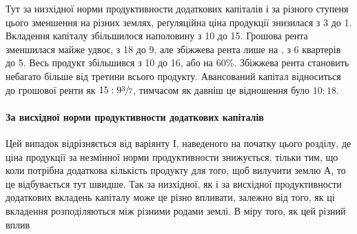 \noindent{}Тут за низхідної норми продуктивности додаткових капіталів і за різного
ступеня цього зменшення на різних землях, реґуляційна ціна продукції знизилася
з 3 до 1. Вкладення капіталу збільшилося наполовину з 10 до 15. Грошова рента зменшилася майже удвоє, з 18 до 9, але збіжжева рента лише на ,
з 6 квартерів до 5. Весь продукт
збільшився з 10 до 16, або на 60\%.
Збіжжева рента становить небагато більше
від третини всього продукту. Авансований капітал відноситься до грошової ренти
як $15 : 9\sfrac{3}{7}$, тимчасом як давніш це відношення було $10:18$.

\paragraph{За висхідної норми продуктивности додаткових капіталів}

Цей випадок відрізняється від варіянту І, наведеного на початку цього
розділу, де ціна продукції за незмінної норми продуктивности знижується, тільки
тим, що коли потрібна додаткова кількість продукту для того, щоб вилучити
землю $А$, то це відбувається тут швидше.
Так за низхідної, як і за висхідної продуктивности додаткових вкладень
капіталу може це різно впливати, залежно від того, як ці вкладення розподіляються
між різними родами землі. В міру того, як цей різний вплив
\parbreak{}  %
